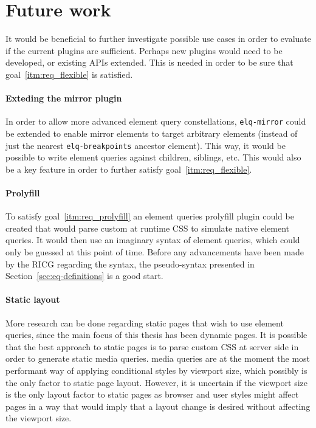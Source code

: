 \documentclass[a4paper,11pt]{kth-mag}
\newcommand{\code}[1]{\texttt{#1}}
\begin{document}
    \section{Future work}
      It would be beneficial to further investigate possible use cases in order to evaluate if the current plugins are sufficient.
      Perhaps new plugins would need to be developed, or existing \glspl{API} extended.
      This is needed in order to be sure that goal~\ref{itm:req_flexible} is satisfied.

      \paragraph{Exteding the mirror plugin}
      In order to allow more advanced element query constellations, \code{elq-mirror} could be extended to enable mirror \glspl{element} to target arbitrary \glspl{element} (instead of just the nearest \code{elq-breakpoints} ancestor \gls{element}).
      This way, it would be possible to write element queries against children, siblings, etc.
      This would also be a key feature in order to further satisfy goal~\ref{itm:req_flexible}.

      \paragraph{Prolyfill}
      To satisfy goal~\ref{itm:req_prolyfill} an element queries prolyfill plugin could be created that would parse custom at runtime \gls{CSS} to simulate \gls{native} element queries.
      It would then use an imaginary syntax of element queries, which could only be guessed at this point of time.
      Before any advancements have been made by the RICG regarding the syntax, the pseudo-syntax presented in Section~\ref{sec:eq-definitions} is a good start.

      \paragraph{Static layout}
      More research can be done regarding static pages that wish to use element queries, since the main focus of this thesis has been dynamic pages.
      It is possible that the best approach to static pages is to parse custom \gls{CSS} at server side in order to generate static \gls{media queries}.
      \Gls{media queries} are at the moment the most performant way of applying conditional styles by \gls{viewport} size, which possibly is the only factor to static page layout.
      However, it is uncertain if the \gls{viewport} size is the only layout factor to static pages as \gls{browser} and user styles might affect pages in a way that would imply that a layout change is desired without affecting the \gls{viewport} size.
\end{document}
